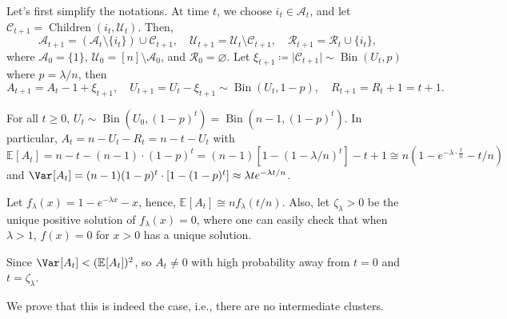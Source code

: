 Let's first simplify the notations. At time \(t\), we choose \(i_t \in \mathcal{A} _t\), and let \(\mathcal{C} _{t+1} = \operatorname{Children}(i_t, \mathcal{U} _t) \). Then,
\[
	\mathcal{A} _{t+1} = (\mathcal{A} _t \setminus \{ i_t \} ) \cup \mathcal{C} _{t+1}, \quad
	\mathcal{U} _{t+1} = \mathcal{U} _t \setminus \mathcal{C} _{t+1}, \quad
	\mathcal{R} _{t+1} = \mathcal{R} _{t} \cup \{ i_t \} ,
\]
where \(\mathcal{A} _0 = \{ 1 \} \), \(\mathcal{U} _0 = [n] \setminus \mathcal{A} _0\), and \(\mathcal{R} _0 = \varnothing \). Let \(\xi _{t+1} \coloneqq \lvert \mathcal{C} _{t+1} \rvert \sim \operatorname{Bin}(U_t, p) \) where \(p = \lambda / n\), then
\[
	A_{t+1} = A_t - 1 + \xi _{t+1}, \quad
	U_{t+1} = U_t - \xi _{t+1} \sim \operatorname{Bin}(U_t, 1 - p), \quad
	R_{t+1} = R_t + 1 = t+1.
\]

\begin{claim}
	For all \(t \geq 0\), \(U_t \sim \operatorname{Bin}(U_0, (1 - p)^t) = \operatorname{Bin}(n-1, (1 - p)^t)  \). In particular, \(A_t = n - U_t - R_t = n - t - U_t\) with
	\[
		\mathbb{E}_{}[A_t]
		= n - t - (n - 1) \cdot (1 - p)^t
		= (n-1) \left[ 1 - \left( 1- \lambda / n \right) ^t \right]  - t + 1
		\cong n \left( 1 - e^{-\lambda \cdot \frac{t}{n}} - t / n \right)
	\]
	and \(\Var_{}[A_t] = (n-1)(1 - p)^t \cdot [1 - (1 - p)^t] \approx \lambda t e^{-\lambda t / n}\).
\end{claim}

Let \(f_\lambda (x) = 1 - e^{-\lambda x} - x\), hence, \(\mathbb{E}_{}[A_t] \cong n f_\lambda (t / n)\). Also, let \(\zeta _\lambda > 0\) be the unique positive solution of \(f_\lambda (x) = 0\), where one can easily check that when \(\lambda > 1\), \(f(x) = 0\) for \(x > 0\) has a unique solution.

\begin{intuition}
	Since \(\Var_{}[A_t] < (\mathbb{E}_{}[A_t]) ^2 \), so \(A_t \neq 0\) with high probability away from \(t = 0\) and \(t = \zeta _\lambda \).
\end{intuition}

We prove that this is indeed the case, i.e., there are no intermediate clusters.


